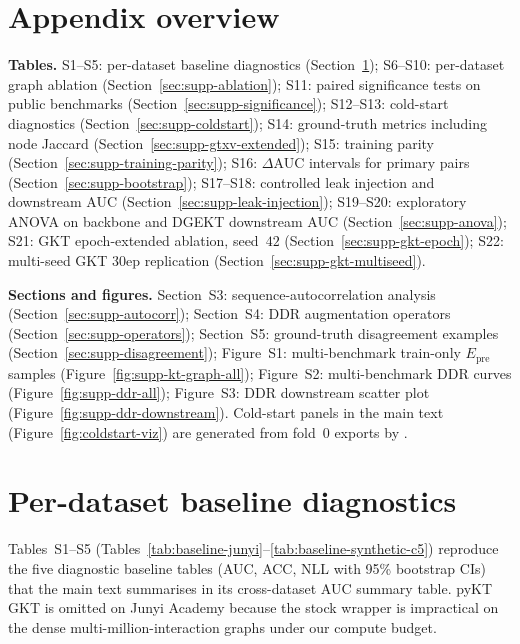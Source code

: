 \documentclass[pdflatex,sn-mathphys-num]{sn-jnl}
\newcommand{\Epre}{\ensuremath{E_{\text{pre}}}}
\newcommand{\DDR}{\textsc{DDR}}
\begin{document}
\appendix
\section*{Appendix overview}
\label{sec:appendix-index}
\noindent\textbf{Tables.}
S1--S5: per-dataset baseline diagnostics (Section~\ref{sec:supp-baseline});
S6--S10: per-dataset graph ablation (Section~\ref{sec:supp-ablation});
S11: paired significance tests on public benchmarks
(Section~\ref{sec:supp-significance});
S12--S13: cold-start diagnostics (Section~\ref{sec:supp-coldstart});
S14: ground-truth metrics including node Jaccard
(Section~\ref{sec:supp-gtxv-extended});
S15: training parity (Section~\ref{sec:supp-training-parity});
S16: $\Delta$AUC intervals for primary pairs (Section~\ref{sec:supp-bootstrap});
S17--S18: controlled leak injection and downstream AUC
(Section~\ref{sec:supp-leak-injection});
S19--S20: exploratory ANOVA on backbone and DGEKT downstream AUC
(Section~\ref{sec:supp-anova});
S21: GKT epoch-extended ablation, seed~$42$ (Section~\ref{sec:supp-gkt-epoch});
S22: multi-seed GKT 30ep replication (Section~\ref{sec:supp-gkt-multiseed}).

\medskip\noindent\textbf{Sections and figures.}
Section~S3: sequence-autocorrelation analysis
(Section~\ref{sec:supp-autocorr});
Section~S4: \DDR{} augmentation operators (Section~\ref{sec:supp-operators});
Section~S5: ground-truth disagreement examples
(Section~\ref{sec:supp-disagreement});
Figure~S1: multi-benchmark train-only $\Epre$ samples
(Figure~\ref{fig:supp-kt-graph-all});
Figure~S2: multi-benchmark \DDR{} curves (Figure~\ref{fig:supp-ddr-all});
Figure~S3: \DDR{} downstream scatter plot
(Figure~\ref{fig:supp-ddr-downstream}).
Cold-start panels in the main text (Figure~\ref{fig:coldstart-viz}) are
generated from fold~0 exports by .

\section{Per-dataset baseline diagnostics}
\label{sec:supp-baseline}
Tables~S1--S5 (Tables~\ref{tab:baseline-junyi}--\ref{tab:baseline-synthetic-c5})
reproduce the five diagnostic baseline tables (AUC, ACC, NLL with 95\% bootstrap
CIs) that the main text summarises in its cross-dataset AUC summary table.
pyKT GKT is omitted on Junyi Academy because the stock wrapper is impractical on
the dense multi-million-interaction graphs under our compute budget.
\end{document}
